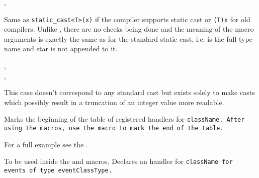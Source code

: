 
,\\


\label{wxstaticcastraw}


Same as \texttt{static\_cast<T>(x)} if the compiler supports static cast or
\texttt{(T)x} for old compilers. Unlike ,
there are no checks being done and the meaning of the macro arguments is exactly
the same as for the standard static cast, i.e.  is the full type name and
star is not appended to it.


,\\
,\\


\label{wxtruncatecast}


This case doesn't correspond to any standard cast but exists solely to make
casts which possibly result in a truncation of an integer value more readable.




\label{wxbeginhandlerstable}


Marks the beginning of the table of registered handlers for \tt{className}.
After using the  macros, use the
 macro 
to mark the end of the table.

For a full example see the .


\label{wxhandler}


To be used inside the 
and  macros.
Declares an handler for \tt{className} for events of type \tt{eventClassType}.

